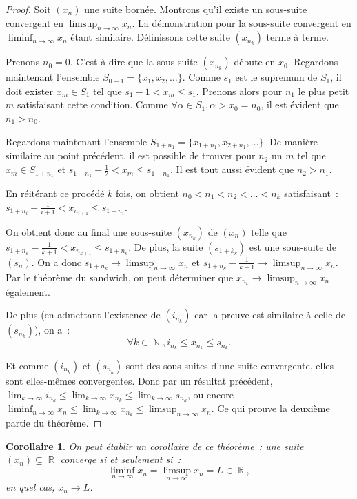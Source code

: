 \documentclass{article}
\DeclareMathOperator{\R}{\mathbb R}
\DeclareMathOperator{\N}{\mathbb N}
\newtheorem{cor}[thm]{Corollaire}
\theoremstyle{definition}
\theoremstyle{remark}
\begin{document}
		\begin{proof} Soit $(x_n)$ une suite bornée. Montrons qu'il existe un sous-suite convergent en $\limsup_{n\to\infty}x_n$. La démonstration
		pour la sous-suite convergent en $\liminf_{n\to\infty}x_n$ étant similaire. Définissons cette suite $(x_{n_k})$ terme à terme.

		Prenons $n_0 = 0$. C'est à dire que la sous-suite $(x_{n_k})$ débute en $x_0$. Regardons maintenant l'ensemble $S_{0+1} = \{x_1, x_2, \ldots\}$.
		Comme $s_1$ est le supremum de $S_1$, il doit exister $x_m \in S_1$ tel que $s_1-1 < x_m \leq s_1$. Prenons alors pour $n_1$ le plus petit $m$
		satisfaisant cette condition. Comme $\forall \alpha \in S_1, \alpha > x_0 = n_0$, il est évident que $n_1 > n_0$.

		Regardons maintenant l'ensemble $S_{1+n_1} = \{x_{1+n_1}, x_{2+n_1}, \ldots\}$. De manière similaire au point précédent, il est possible de trouver pour
		$n_2$ un $m$ tel que $x_m \in S_{1+n_1}$ et $s_{1+n_1}-\frac 12 < x_m \leq s_{1+n_1}$. Il est tout aussi évident que $n_2 > n_1$.

		En réitérant ce procédé $k$ fois, on obtient $n_0 < n_1 < n_2 <\ldots < n_k$ satisfaisant~: $s_{1+n_i} - \frac 1{i+1} < x_{n_{i+1}} \leq s_{1+n_i}$.

		On obtient donc au final une sous-suite $(x_{n_k})$ de $(x_n)$ telle que $s_{1+n_k} - \frac 1{k+1} < x_{n_{k+1}} \leq s_{1+n_k}$. De plus, la suite
		$(s_{1+k_k})$ est une sous-suite de $(s_n)$. On a donc $s_{1+n_k} \to \limsup_{n\to\infty}x_n$ et $s_{1+n_k} - \frac 1{k+1} \to \limsup_{n\to\infty}x_n$.
		Par le théorème du sandwich, on peut déterminer que $x_{n_k} \to \limsup_{n\to\infty}x_n$ également.

		De plus (en admettant l'existence de $(i_{n_k})$ car la preuve est similaire à celle de $(s_{n_k})$), on a~:
		\[\forall k \in \N, i_{n_k} \leq x_{n_k} \leq s_{n_k}.\]

		Et comme $(i_{n_k})$ et $(s_{n_k})$ sont des sous-suites d'une suite convergente, elles sont elles-mêmes convergentes. Donc par un résultat précédent,
		$\lim_{k\to\infty}i_{n_k} \leq \lim_{k\to\infty}x_{n_k} \leq \lim_{k\to\infty}s_{n_k}$, ou encore
		$\liminf_{n\to\infty}x_n \leq \lim_{k\to\infty}x_{n_k} \leq \limsup_{n\to\infty}x_n$. Ce qui prouve la deuxième partie du théorème. \end{proof}

		\begin{cor} On peut établir un corollaire de ce théorème~: une suite $(x_n) \subseteq \R$ converge si et seulement si~:
		\[\liminf_{n\to\infty}x_n = \limsup_{n\to\infty}x_n = L \in \R,\]
		en quel cas, $x_n \to L$. \end{cor}
\end{document}
